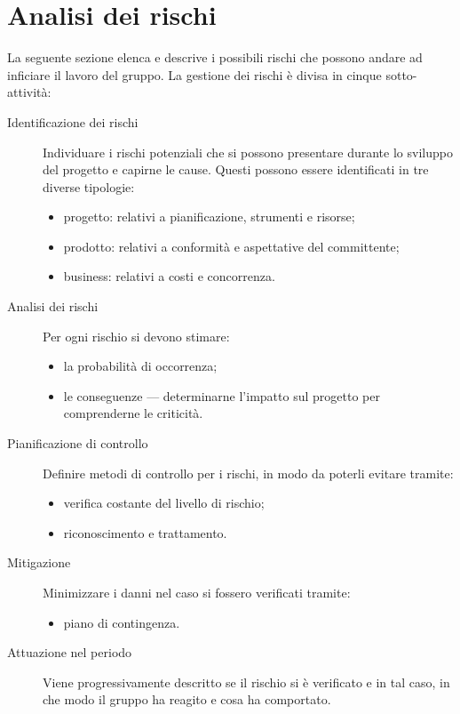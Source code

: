 
\section{Analisi dei rischi} \label{sec:rischi}

La seguente sezione elenca e descrive i possibili rischi che possono andare ad inficiare il lavoro del gruppo. La gestione dei rischi è divisa in cinque sotto-attività:
\begin{description}
	\item[Identificazione dei rischi] Individuare i rischi potenziali che si possono presentare durante lo sviluppo del progetto e capirne le cause. Questi possono essere identificati in tre diverse tipologie:
	\begin{itemize}
		\item progetto: relativi a pianificazione, strumenti e risorse;
		\item prodotto: relativi a conformità e aspettative del committente;
		\item business: relativi a costi e concorrenza.
	\end{itemize}
	\item[Analisi dei rischi] Per ogni rischio si devono stimare:
	\begin{itemize}
		\item la probabilità di occorrenza;
		\item le conseguenze --- determinarne l'impatto sul progetto per comprenderne le criticità.
	\end{itemize}
	\item[Pianificazione di controllo] Definire metodi di controllo per i rischi, in modo da poterli evitare tramite:
	\begin{itemize}
		\item verifica costante del livello di rischio;
		\item riconoscimento e trattamento.
	\end{itemize}
	\item[Mitigazione] Minimizzare i danni nel caso si fossero verificati tramite:
	\begin{itemize}
		\item piano di contingenza.
	\end{itemize}
	\item[Attuazione nel periodo] Viene progressivamente descritto se il rischio si è verificato e in tal caso, in che modo il gruppo ha reagito e cosa ha comportato.
\end{description}
